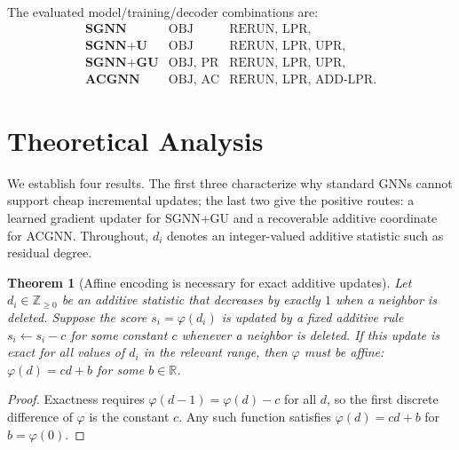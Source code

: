 \documentclass[11pt]{article}
\theoremstyle{plain}
\newtheorem{theorem}{Theorem}[section]
\theoremstyle{definition}
\theoremstyle{remark}
\begin{document}
The evaluated model/training/decoder combinations are:
\[
  \begin{array}{lll}
    \textbf{SGNN}     & \text{OBJ}      & \text{RERUN, LPR},\\
    \textbf{SGNN+U}   & \text{OBJ}      & \text{RERUN, LPR, UPR},\\
    \textbf{SGNN+GU}  & \text{OBJ, PR}  & \text{RERUN, LPR, UPR},\\
    \textbf{ACGNN}    & \text{OBJ, AC}  & \text{RERUN, LPR, ADD-LPR}.
  \end{array}
\]

\section{Theoretical Analysis}
\label{sec:theory}

We establish four results. The first three characterize why standard GNNs cannot
support cheap incremental updates; the last two give the positive routes: a learned gradient updater for SGNN+GU and a recoverable additive coordinate for ACGNN. Throughout, $d_i$ denotes an integer-valued additive statistic such as residual
degree.

\begin{theorem}[Affine encoding is necessary for exact additive updates]
  \label{thm:affine}
  Let $d_i \in \mathbb{Z}_{\geq 0}$ be an additive statistic that decreases by
  exactly $1$ when a neighbor is deleted. Suppose the score $s_i = \varphi(d_i)$ is
  updated by a fixed additive rule $s_i \leftarrow s_i - c$ for some constant $c$
  whenever a neighbor is deleted. If this update is exact for all values of $d_i$ in
  the relevant range, then $\varphi$ must be affine: $\varphi(d) = cd + b$ for some
  $b \in \mathbb{R}$.
\end{theorem}
\begin{proof}
  Exactness requires $\varphi(d - 1) = \varphi(d) - c$ for all $d$, so the first
  discrete difference of $\varphi$ is the constant $c$. Any such function satisfies
  $\varphi(d) = cd + b$ for $b = \varphi(0)$.
\end{proof}
\end{document}
